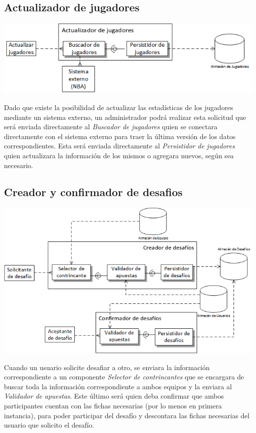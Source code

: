 \subsection{Actualizador de jugadores}
\begin{center}
\includegraphics[scale=0.80]{diagramas/tp1/buscadordejugadores.png}
\end{center}
\label{fig:buscadordejugadores}

Dado que existe la posibilidad de actualizar las estadísticas de los jugadores mediante un sistema externo, un administrador podrá realizar esta solicitud que será enviada directamente al \emph{Buscador de jugadores} quien se conectara directamente con el sistema externo para traer la última versión de los datos correspondientes. Esta será enviada directamente al \emph{Persistidor de jugadores} quien actualizara la información de los mismos o agregara nuevos, según sea necesario.

\subsection{Creador y confirmador de desafios}
\includegraphics[scale=0.80]{diagramas/tp1/desafios.png}
\label{fig:desafios}

Cuando un usuario solicite desafiar a otro, se enviara la información correspondiente a un componente \emph{Selector de contrincantes} que se encargara de buscar toda la información correspondiente a ambos equipos y la enviara al \emph{Validador de apuestas}. Este último será quien deba confirmar que ambos participantes cuentan con las fichas necesarias (por lo menos en primera instancia), para poder participar del desafío y descontara las fichas necesarias del usuario que solicito el desafío.


